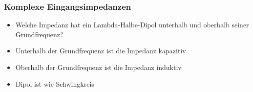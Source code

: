 \begin{frame}
  \frametitle{Komplexe Eingangsimpedanzen}
  \begin{center}
    \begin{itemize}
      \item Welche Impedanz hat ein Lambda-Halbe-Dipol unterhalb und oberhalb seiner Grundfrequenz? \\[1em]
      \item Unterhalb der Grundfrequenz ist die Impedanz kapazitiv \\[1em]
      \item Oberhalb der Grundfrequenz ist die Impedanz induktiv \\[1em]
      \item Dipol ist wie Schwingkreis
    \end{itemize}
  \end{center}
\end{frame}

